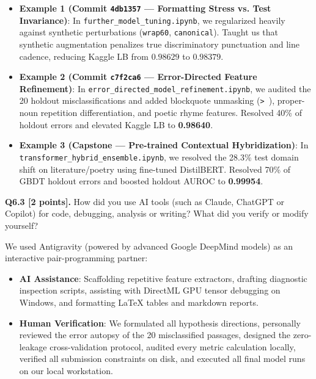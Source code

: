 \documentclass[11pt,letterpaper]{article}
\begin{document}
\begin{itemize}[leftmargin=*,itemsep=1pt]
    \item \textbf{Example 1 (Commit \texttt{4db1357} --- Formatting Stress vs. Test Invariance)}: In \texttt{further\_model\_tuning.ipynb}, we regularized heavily against synthetic perturbations (\texttt{wrap60}, \texttt{canonical}). Taught us that synthetic augmentation penalizes true discriminatory punctuation and line cadence, reducing Kaggle LB from $0.98629$ to $0.98379$.
    \item \textbf{Example 2 (Commit \texttt{c7f2ca6} --- Error-Directed Feature Refinement)}: In \texttt{error\_directed\_model\_refinement.ipynb}, we audited the 20 holdout misclassifications and added blockquote unmasking (\texttt{> }), proper-noun repetition differentiation, and poetic rhyme features. Resolved 40\% of holdout errors and elevated Kaggle LB to \textbf{0.98640}.
    \item \textbf{Example 3 (Capstone --- Pre-trained Contextual Hybridization)}: In \texttt{transformer\_hybrid\_ensemble.ipynb}, we resolved the 28.3\% test domain shift on literature/poetry using fine-tuned DistilBERT. Resolved 70\% of GBDT holdout errors and boosted holdout AUROC to \textbf{0.99954}.
\end{itemize}

\newpage

\textbf{Q6.3 [2 points].} How did you use AI tools (such as Claude, ChatGPT or Copilot) for code, debugging, analysis or writing? What did you verify or modify yourself?

We used Antigravity (powered by advanced Google DeepMind models) as an interactive pair-programming partner:
\begin{itemize}[leftmargin=*,itemsep=1pt]
    \item \textbf{AI Assistance}: Scaffolding repetitive feature extractors, drafting diagnostic inspection scripts, assisting with DirectML GPU tensor debugging on Windows, and formatting LaTeX tables and markdown reports.
    \item \textbf{Human Verification}: We formulated all hypothesis directions, personally reviewed the error autopsy of the 20 misclassified passages, designed the zero-leakage cross-validation protocol, audited every metric calculation locally, verified all submission constraints on disk, and executed all final model runs on our local workstation.
\end{itemize}
\end{document}
